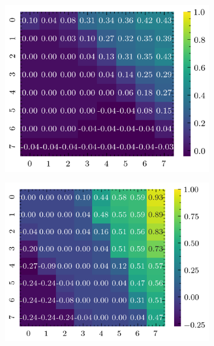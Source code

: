 \documentclass[../document.tex]{subfiles}
\begin{document}
\begin{figure}[H]
    \begin{subfigure}[b]{0.19\textwidth}
        \includegraphics[width=\linewidth]{../img/5/quarry/worst/heatmap-2d-0.png}
    \end{subfigure}
    \begin{subfigure}[b]{0.19\textwidth}
        \includegraphics[width=\linewidth]{../img/5/quarry/worst/heatmap-2d-1.png}
    \end{subfigure}  
    \begin{subfigure}[b]{0.19\textwidth}

\end{subfigure}
\end{figure}
\end{document}
